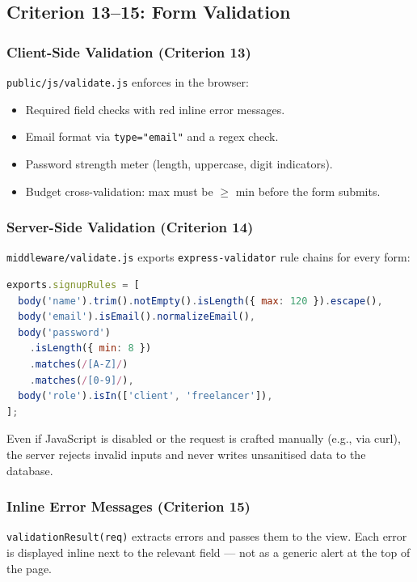 \documentclass[12pt,a4paper]{article}
\begin{document}
\subsection{Criterion 13--15: Form Validation}

\subsubsection{Client-Side Validation (Criterion 13)}

\texttt{public/js/validate.js} enforces in the browser:
\begin{itemize}[noitemsep]
  \item Required field checks with red inline error messages.
  \item Email format via \texttt{type="email"} and a regex check.
  \item Password strength meter (length, uppercase, digit indicators).
  \item Budget cross-validation: max must be $\geq$ min before the form submits.
\end{itemize}

\subsubsection{Server-Side Validation (Criterion 14)}

\texttt{middleware/validate.js} exports \texttt{express-validator} rule chains for every form:

\begin{lstlisting}[language=JavaScript, caption={Signup validation rules (excerpt)}]
exports.signupRules = [
  body('name').trim().notEmpty().isLength({ max: 120 }).escape(),
  body('email').isEmail().normalizeEmail(),
  body('password')
    .isLength({ min: 8 })
    .matches(/[A-Z]/)
    .matches(/[0-9]/),
  body('role').isIn(['client', 'freelancer']),
];
\end{lstlisting}

Even if JavaScript is disabled or the request is crafted manually (e.g., via curl), the server rejects invalid inputs and never writes unsanitised data to the database.

\subsubsection{Inline Error Messages (Criterion 15)}

\texttt{validationResult(req)} extracts errors and passes them to the view. Each error is displayed inline next to the relevant field --- not as a generic alert at the top of the page.
\end{document}
